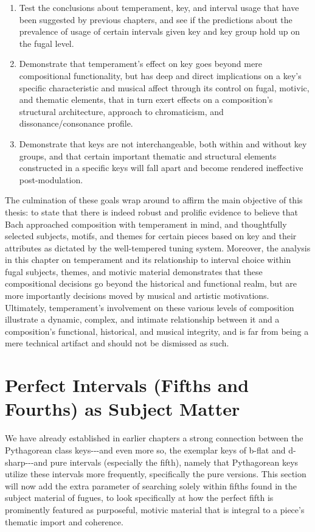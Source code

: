 \begin{enumerate}
\def\labelenumi{\arabic{enumi}.}
\tightlist
\item
  Test the conclusions about temperament, key, and interval usage that
  have been suggested by previous chapters, and see if the predictions
  about the prevalence of usage of certain intervals given key and key
  group hold up on the fugal level.
\item
  Demonstrate that temperament's effect on key goes beyond mere
  compositional functionality, but has deep and direct implications on a
  key's specific characteristic and musical affect through its control
  on fugal, motivic, and thematic elements, that in turn exert effects
  on a composition's structural architecture, approach to chromaticism,
  and dissonance/consonance profile.
\item
  Demonstrate that keys are not interchangeable, both within and without
  key groups, and that certain important thematic and structural
  elements constructed in a specific keys will fall apart and become
  rendered ineffective post-modulation.
\end{enumerate}

The culmination of these goals wrap around to affirm the main objective
of this thesis: to state that there is indeed robust and prolific
evidence to believe that Bach approached composition with temperament in
mind, and thoughtfully selected subjects, motifs, and themes for certain
pieces based on key and their attributes as dictated by the
well-tempered tuning system. Moreover, the analysis in this chapter on
temperament and its relationship to interval choice within fugal
subjects, themes, and motivic material demonstrates that these
compositional decisions go beyond the historical and functional realm,
but are more importantly decisions moved by musical and artistic
motivations. Ultimately, temperament's involvement on these various
levels of composition illustrate a dynamic, complex, and intimate
relationship between it and a composition's functional, historical, and
musical integrity, and is far from being a mere technical artifact and
should not be dismissed as such.

    \section{Perfect Intervals (Fifths and Fourths) as Subject
Matter}\label{perfect-intervals-fifths-and-fourths-as-subject-matter}

We have already established in earlier chapters a strong connection
between the Pythagorean class keys-\/-\/-and even more so, the exemplar
keys of b-flat and d-sharp-\/-\/-and pure intervals (especially the
fifth), namely that Pythagorean keys utilize these intervals more
frequently, specifically the pure versions. This section will now add
the extra parameter of searching solely within fifths found in the
subject material of fugues, to look specifically at how the perfect
fifth is prominently featured as purposeful, motivic material that is
integral to a piece's thematic import and coherence.

